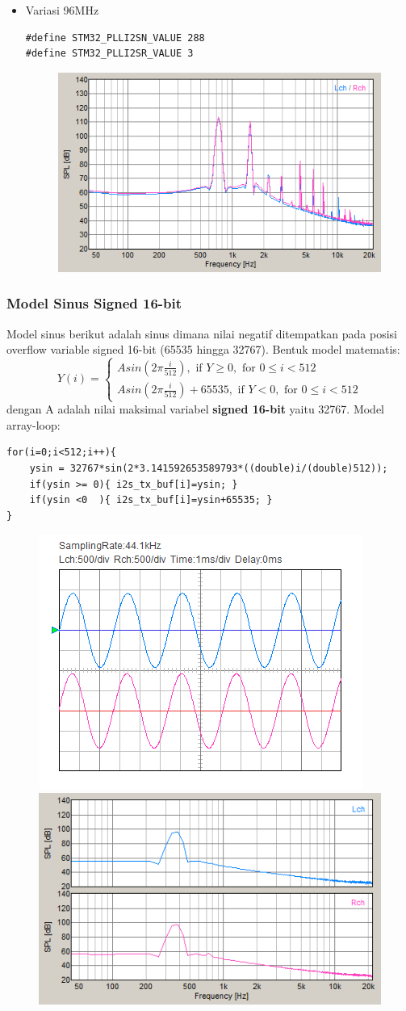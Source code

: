\documentclass[12pt,]{article}
\begin{document}
\begin{itemize}
  		\item Variasi 96MHz
  		\begin{verbatim}
#define STM32_PLLI2SN_VALUE 288
#define STM32_PLLI2SR_VALUE 3
  		\end{verbatim}
  		\begin{figure}[H]
  			\centering
  			\includegraphics[width=0.45\linewidth]{result/day_2/sine_clk96}
  		\end{figure}
  	\end{itemize}
  
  	\newpage
  	\subsubsection{Model Sinus Signed 16-bit}
  	Model sinus berikut adalah sinus dimana nilai negatif ditempatkan
  	pada posisi overflow variable signed 16-bit (65535 hingga 32767).
  	Bentuk model matematis:
  	\[
  	Y(i) = 
  	\begin{cases}
  	A sin(2 \pi \frac{i}{512}), \text{ if } Y \geq 0, \text{ for } 0 \leq i < 512\\ 
  	A sin(2 \pi \frac{i}{512})+65535, \text{ if } Y < 0, \text{ for } 0 \leq i < 512
  	\end{cases}
  	\]
  	dengan A adalah nilai maksimal variabel \textbf{signed 16-bit} yaitu 32767.
  	Model array-loop: 
  	\begin{verbatim}
for(i=0;i<512;i++){
  	ysin = 32767*sin(2*3.141592653589793*((double)i/(double)512));
  	if(ysin >= 0){ i2s_tx_buf[i]=ysin; }
  	if(ysin <0  ){ i2s_tx_buf[i]=ysin+65535; }
}
  	\end{verbatim}
  	\begin{figure}[H]
  		\centering
  		\includegraphics[width=0.45\linewidth]{result/day_4/newsine400}
  		\includegraphics[width=0.45\linewidth]{result/day_4/newsine400fft}
  	\end{figure}
		
\end{document}
